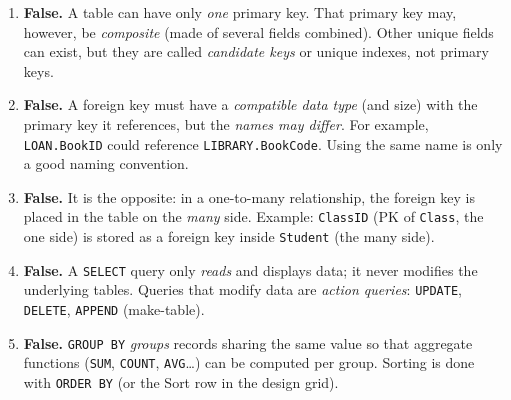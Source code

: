 \documentclass[11pt]{article}
\begin{document}
\begin{corrige}
\begin{enumerate}
\item \textbf{False.} A table can have only \emph{one} primary key. That primary key may, however, be \emph{composite} (made of several fields combined). Other unique fields can exist, but they are called \emph{candidate keys} or unique indexes, not primary keys.
\item \textbf{False.} A foreign key must have a \emph{compatible data type} (and size) with the primary key it references, but the \emph{names may differ}. For example, \texttt{LOAN.BookID} could reference \texttt{LIBRARY.BookCode}. Using the same name is only a good naming convention.
\item \textbf{False.} It is the opposite: in a one-to-many relationship, the foreign key is placed in the table on the \emph{many} side. Example: \texttt{ClassID} (PK of \texttt{Class}, the one side) is stored as a foreign key inside \texttt{Student} (the many side).
\item \textbf{False.} A \texttt{SELECT} query only \emph{reads} and displays data; it never modifies the underlying tables. Queries that modify data are \emph{action queries}: \texttt{UPDATE}, \texttt{DELETE}, \texttt{APPEND} (make-table).
\item \textbf{False.} \texttt{GROUP BY} \emph{groups} records sharing the same value so that aggregate functions (\texttt{SUM}, \texttt{COUNT}, \texttt{AVG}\dots) can be computed per group. Sorting is done with \texttt{ORDER BY} (or the Sort row in the design grid).
\end{enumerate}
\end{corrige}
\end{document}
